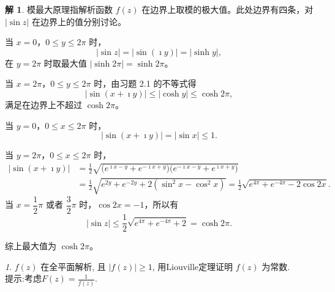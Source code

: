 \documentclass[11pt]{article}
\theoremstyle{remark}
\newtheorem{problem}{}
\theoremstyle{definition}
\newtheorem{solution}{解}
\begin{document}
\begin{solution}
模最大原理指解析函数 $f(z)$ 在边界上取模的极大值。此处边界有四条，对 $|\sin z|$ 在边界上的值分别讨论。

当 $x=0$，$0\leq y\leq 2\pi$ 时，
\[
|\sin z|=|\sin(\imath y)|=|\sinh y|,
\]
在 $y=2\pi$ 时取最大值 $|\sinh 2\pi|=\sinh 2\pi$。

当 $x=2\pi$，$0\leq y\leq 2\pi$ 时，由习题 2.1 的不等式得
\[
|\sin(x+\imath y)|\leq|\cosh y|\leq\cosh 2\pi,
\]
满足在边界上不超过 $\cosh 2\pi$。

当 $y=0$，$0\leq x\leq 2\pi$ 时，
\[
|\sin(x+\imath y)|=|\sin x|\leq 1.
\]

当 $y=2\pi$，$0\leq x\leq 2\pi$ 时，
\begin{align*}
|\sin(x+\imath y)|
&=\frac12\sqrt{\bigl(e^{\imath x-y}+e^{-\imath x+y}\bigr)
\bigl(e^{-\imath x-y}+e^{\imath x+y}\bigr)} \\
&=\frac12\sqrt{e^{2y}+e^{-2y}+2(\sin^{2}x-\cos^{2}x)}
=\frac12\sqrt{e^{4\pi}+e^{-4\pi}-2\cos 2x}.
\end{align*}
当 $x=\dfrac12\pi$ 或者 $\dfrac32\pi$ 时，$\cos 2x=-1$，所以有
\[
|\sin z|\leq\frac12\sqrt{e^{4\pi}+e^{-4\pi}+2}=\cosh 2\pi.
\]

综上最大值为 $\cosh 2\pi$。

\begin{center}
\end{center}
\end{solution}

\begin{problem}
$f(z)$ 在全平面解析, 且 $|f(z)| \geq 1$, 用Liouville定理证明 $f(z)$ 为常数.
\\
提示:考虑$F(z) = \frac{1}{f(z)}$.
\end{problem}
\end{document}
